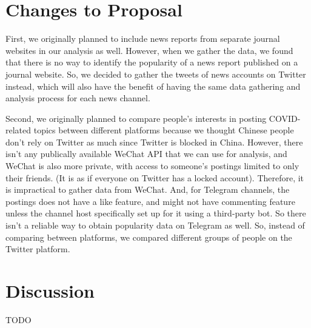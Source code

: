 \documentclass{article}
\begin{document}
    \section{Changes to Proposal}
    \indent

    First, we originally planned to include news reports from separate journal websites in our analysis as well. However, when we gather the data, we found that there is no way to identify the popularity of a news report published on a journal website. So, we decided to gather the tweets of news accounts on Twitter instead, which will also have the benefit of having the same data gathering and analysis process for each news channel.

    Second, we originally planned to compare people's interests in posting COVID-related topics between different platforms because we thought Chinese people don't rely on Twitter as much since Twitter is blocked in China. However, there isn't any publically available WeChat API that we can use for analysis, and WeChat is also more private, with access to someone's postings limited to only their friends. (It is as if everyone on Twitter has a locked account). Therefore, it is impractical to gather data from WeChat. And, for Telegram channels, the postings does not have a like feature, and might not have commenting feature unless the channel host specifically set up for it using a third-party bot. So there isn't a reliable way to obtain popularity data on Telegram as well. So, instead of comparing between platforms, we compared different groups of people on the Twitter platform.

    \section{Discussion}
    \indent

    TODO
    
    
\nocite{*}
\printbibliography
\end{document}
